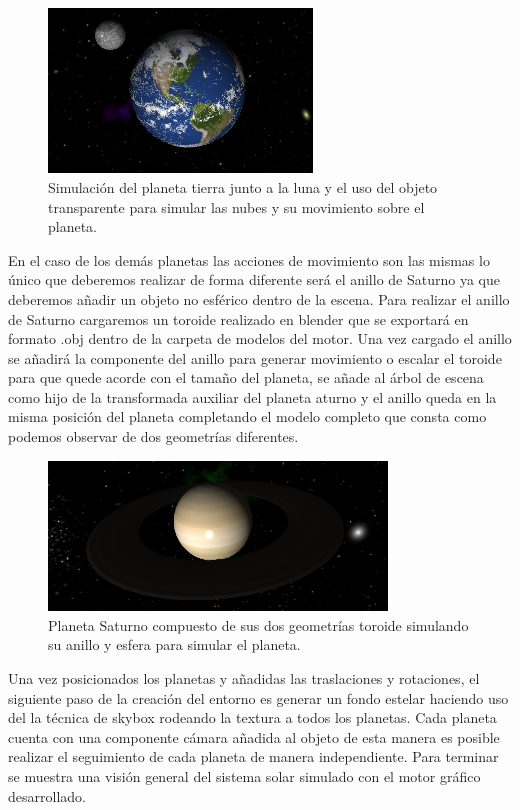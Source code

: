 \documentclass[a4paper]{book}
\begin{document}
\begin{figure}[H]
    \centering
    \includegraphics[width=7cm, keepaspectratio]{img/Earth.png}
    \caption{Simulación del planeta tierra junto a la luna y el uso del objeto transparente para simular las nubes y su
    movimiento sobre el planeta.}
    \label{Earth}
\end{figure}

En el caso de los demás planetas las acciones de movimiento son las mismas lo único que deberemos realizar de forma diferente
será el anillo de Saturno ya que deberemos añadir un objeto no esférico dentro de la escena. Para realizar el anillo de Saturno cargaremos
un toroide realizado en blender que se exportará en formato .obj dentro de la carpeta de modelos del motor. Una vez cargado el anillo se
añadirá la componente del anillo para generar movimiento o escalar el toroide para que quede acorde con el tamaño del planeta, se añade al
árbol de escena como hijo de la transformada auxiliar del planeta aturno y el anillo queda en la misma posición del planeta completando el modelo completo que consta como podemos observar de
dos geometrías diferentes.

\begin{figure}[H]
    \centering
    \includegraphics[width=9cm, keepaspectratio]{img/saturno.png}
    \caption{Planeta Saturno compuesto de sus dos geometrías toroide simulando su anillo y esfera para simular el planeta.}
    \label{saturno}
\end{figure}

Una vez posicionados los planetas y añadidas las traslaciones y rotaciones, el siguiente paso de la creación del entorno es generar
un fondo estelar haciendo uso del la técnica de skybox rodeando la textura a todos los planetas. Cada planeta cuenta con una
componente cámara añadida al objeto de esta manera es posible realizar el seguimiento de cada planeta de manera independiente.
Para terminar se muestra una visión general del sistema solar simulado con el motor gráfico desarrollado.
\end{document}
